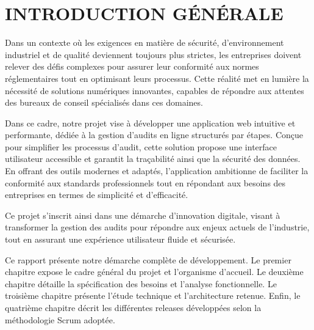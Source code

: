 \chapter*{INTRODUCTION GÉNÉRALE}
\adjustmtc
\thispagestyle{MyStyle}

\noindent Dans un contexte où les exigences en matière de sécurité, d'environnement industriel et de qualité deviennent toujours plus strictes, les entreprises doivent relever des défis complexes pour assurer leur conformité aux normes réglementaires tout en optimisant leurs processus. Cette réalité met en lumière la nécessité de solutions numériques innovantes, capables de répondre aux attentes des bureaux de conseil spécialisés dans ces domaines.

Dans ce cadre, notre projet vise à développer une application web intuitive et performante, dédiée à la gestion d'audits en ligne structurés par étapes. Conçue pour simplifier les processus d'audit, cette solution propose une interface utilisateur accessible et garantit la traçabilité ainsi que la sécurité des données. En offrant des outils modernes et adaptés, l'application ambitionne de faciliter la conformité aux standards professionnels tout en répondant aux besoins des entreprises en termes de simplicité et d'efficacité.

Ce projet s'inscrit ainsi dans une démarche d'innovation digitale, visant à transformer la gestion des audits pour répondre aux enjeux actuels de l'industrie, tout en assurant une expérience utilisateur fluide et sécurisée.

Ce rapport présente notre démarche complète de développement. Le premier chapitre expose le cadre général du projet et l'organisme d'accueil. Le deuxième chapitre détaille la spécification des besoins et l'analyse fonctionnelle. Le troisième chapitre présente l'étude technique et l'architecture retenue. Enfin, le quatrième chapitre décrit les différentes releases développées selon la méthodologie Scrum adoptée.
